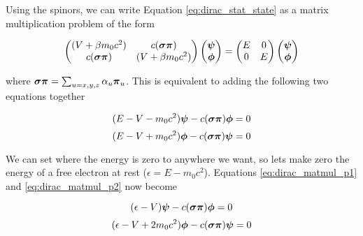 Using the spinors, we can write Equation \ref{eq:dirac_stat_state} as a matrix multiplication problem of the form

\begin{equation}
\label{eq:dirac_stat_state_matmul}
\begin{pmatrix}
(V + \beta m_{0}c^{2})	&	c({\bf{\sigma\pi}})		\\
c({\bf{\sigma\pi}})		&	(V + \beta m_{0}c^{2})	\\
\end{pmatrix}
\begin{pmatrix}
{\bf{\psi}}	\\
{\bf{\phi}}	\\
\end{pmatrix}
=
\begin{pmatrix}
E	&	0	\\
0	&	E	\\
\end{pmatrix}
\begin{pmatrix}
{\bf{\psi}}	\\
{\bf{\phi}}	\\
\end{pmatrix}
\end{equation}

where ${\bf{\sigma\pi}} =\sum_{u=x,y,z}\alpha_{u}{\bf{\pi}}_{u}$. This is equivalent to adding the following two equations together

\begin{equation}
\label{eq:dirac_matmul_p1}
(E - V - m_{0}c^{2}){\bf{\psi}} - c({\bf{\sigma\pi}}){\bf{\phi}} = 0
\end{equation}
\begin{equation}
\label{eq:dirac_matmul_p2}
(E - V + m_{0}c^{2}){\bf{\phi}} - c({\bf{\sigma\pi}}){\bf{\psi}} = 0
\end{equation}

We can set where the energy is zero to anywhere we want, so lets make zero the energy of a free electron at rest ($\epsilon = E - m_{0}c^{2}$). Equations \ref{eq:dirac_matmul_p1} and \ref{eq:dirac_matmul_p2} now become

\begin{equation}
\label{eq:dirac_matmul_p3}
(\epsilon - V){\bf{\psi}} - c({\bf{\sigma\pi}}){\bf{\phi}} = 0
\end{equation}
\begin{equation}
\label{eq:dirac_matmul_p4}
(\epsilon - V + 2m_{0}c^{2}){\bf{\phi}} - c({\bf{\sigma\pi}}){\bf{\psi}} = 0
\end{equation}

